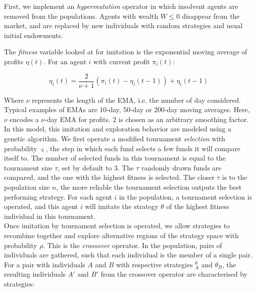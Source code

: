 \documentclass{article}
\begin{document}
First, we implement an \textit{hypermutation} operator in which insolvent agents are removed from the populations. Agents with wealth $W \leq 0$ disappear from the market, and are replaced by new individuals with random strategies and usual initial endowments.

The \textit{fitness} variable looked at for imitation is the exponential moving average of profits $\eta(t)$. For an agent $i$ with current profit $\pi_i(t)$:

\begin{equation}
    \eta_i(t) =  \frac{2}{ \nu + 1} \left(\pi_i(t) -  \eta_i(t-1)\right) +  \eta_i(t-1)
\end{equation}

Where $\nu$ represents the length of the EMA, i.e. the number of day considered. Typical examples of EMAs are 10-day, 50-day or 200-day moving averages. Here, $\nu$ encodes a $\nu$-day EMA for profits. $2$ is chosen as an arbitrary smoothing factor.\\

In this model, this imitation and exploration behavior are modeled using a genetic algorithm. We first operate a modified tournament \textit{selection} with probability $\varsigma$, the step in which each fund selects a few funds it will compare itself to. The number of selected funds in this tournament is equal to the tournament size $\tau$, set by default to 3. The $\tau$ randomly drawn funds are compared, and the one with the highest fitness is selected. The closer $\tau$ is to the population size $n$, the more reliable the tournament selection outputs the best performing strategy. For each agent $i$ in the population, a tournament selection is operated, and this agent $i$ will imitate the strategy $\theta$ of the highest fitness individual in this tournament.\\

Once imitation by tournament selection is operated, we allow strategies to recombine together and explore alternative regions of the strategy space with probability $\rho$. This is the \textit{crossover} operator. In the population, pairs of individuals are gathered, such that each individual is the member of a single pair. For a pair with individuals $A$ and $B$ with respective strategies $^\theta_A$ and $\theta_B$, the resulting individuals $A'$ and $B'$ from the crossover operator are characterised by strategies:
\end{document}
